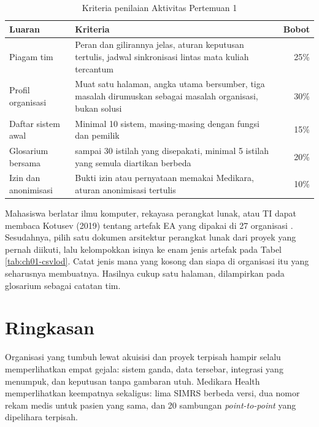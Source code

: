 \begin{table}[!htb]
  \centering
  \caption{Kriteria penilaian Aktivitas Pertemuan 1}
  \label{tab:ch01-kriteria}
  \footnotesize
  \begin{tabularx}{\textwidth}{>{\raggedright\arraybackslash}p{2.6cm}
      >{\raggedright\arraybackslash}X r}
    \hline
    \textbf{Luaran} & \textbf{Kriteria} & \textbf{Bobot} \\
    \hline
    Piagam tim & Peran dan gilirannya jelas, aturan keputusan tertulis, jadwal sinkronisasi lintas mata kuliah tercantum & 25\% \\
    \hline
    Profil organisasi & Muat satu halaman, angka utama bersumber, tiga masalah dirumuskan sebagai masalah organisasi, bukan solusi & 30\% \\
    \hline
    Daftar sistem awal & Minimal 10 sistem, masing-masing dengan fungsi dan pemilik & 15\% \\
    \hline
    Glosarium bersama & 20 sampai 30 istilah yang disepakati, minimal 5 istilah yang semula diartikan berbeda & 20\% \\
    \hline
    Izin dan anonimisasi & Bukti izin atau pernyataan memakai Medikara, aturan anonimisasi tertulis & 10\% \\
    \hline
  \end{tabularx}
\end{table}

\begin{pendalaman}
  Mahasiswa berlatar ilmu komputer, rekayasa perangkat lunak, atau TI dapat
  membaca Kotusev (2019) tentang artefak EA yang dipakai di 27 organisasi
  \cite{kotusev2019}. Sesudahnya, pilih satu dokumen arsitektur perangkat
  lunak dari proyek yang pernah diikuti, lalu kelompokkan isinya ke enam jenis
  artefak pada Tabel \ref{tab:ch01-csvlod}. Catat jenis mana yang kosong dan
  siapa di organisasi itu yang seharusnya membuatnya. Hasilnya cukup satu
  halaman, dilampirkan pada glosarium sebagai catatan tim.
\end{pendalaman}

\section{Ringkasan}

Organisasi yang tumbuh lewat akuisisi dan proyek terpisah hampir selalu
memperlihatkan empat gejala: sistem ganda, data tersebar, integrasi yang
menumpuk, dan keputusan tanpa gambaran utuh. Medikara Health memperlihatkan
keempatnya sekaligus: lima SIMRS berbeda versi, dua nomor rekam medis untuk
pasien yang sama, dan 20 sambungan \textit{point-to-point} yang dipelihara
terpisah.

